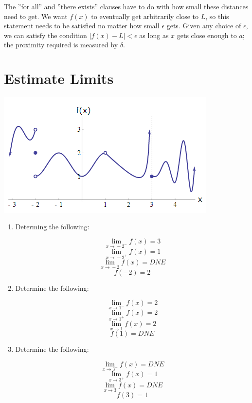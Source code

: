 \documentclass{article}
\begin{document}
The ''for all'' and ''there exists'' clauses have to do with how small these distances need to get.
We want $f (x)$ to eventually get arbitrarily close to $L$, so this statement needs to be satisfied
no matter how small $\epsilon$ gets. Given any choice of $\epsilon$, we can satisfy the condition
$|f (x)-L| < \epsilon$ as long as $x$ gets close enough to $a$; the proximity required is measured by
$\delta$.

\pagebreak
\section{Estimate Limits}
\begin{center}\includegraphics[scale = 0.8]{Images/EstimateLimits1.png}\end{center}
\begin{enumerate}
\item Determing the following:

\[\underset{x\rightarrow{}-2^{-}}{\lim}f (x) = 3\]
\[\underset{x\rightarrow{}-2^{+}}{\lim}f (x) = 1\]
\[\underset{x\rightarrow{}-2}{\lim}f (x) = DNE\]
\[f (-2) = 2\]

\item Determine the following:

\[\underset{x\rightarrow{}1^{-}}{\lim}f (x) = 2\]
\[\underset{x\rightarrow{}1^{+}}{\lim}f (x) = 2\]
\[\underset{x\rightarrow{}1}{\lim}f (x) = 2\]
\[f (1) = DNE\]

\item Determine the following:

\[\underset{x\rightarrow{}3^{-}}{\lim}f (x) = DNE\]
\[\underset{x\rightarrow{}3^{+}}{\lim}f (x) = 1\]
\[\underset{x\rightarrow{}3}{\lim}f (x) = DNE\]
\[f (3) = 1\]

\end{enumerate}

\pagebreak
\end{document}
